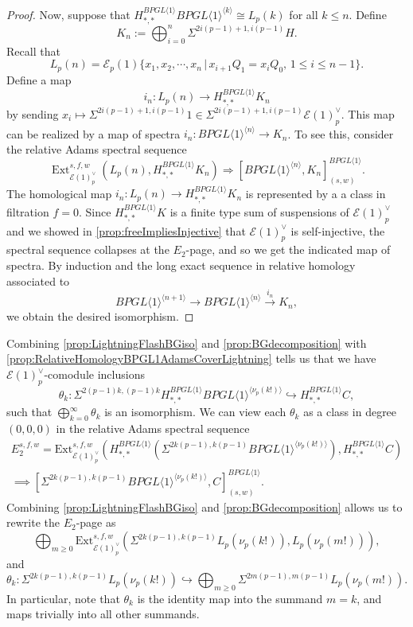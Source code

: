 \documentclass{amsart}
\theoremstyle{plain}
\numberwithin{theorem}{section}
\numberwithin{equation}{section}
\numberwithin{figure}{section}
\DeclareMathOperator{\Ext}{Ext}
\newcommand{\cE}{{\mathcal E}}
\newcommand{\0}{\langle 0 \rangle }
\begin{document}
\begin{proof}
    Now, suppose that $H_{*,*}^{BPGL \langle 1 \rangle}BPGL \langle 1\rangle^{\langle k \rangle} \cong L_p(k)$ for all $k \leq n$. Define    
    \[
    K_n := \bigoplus_{i=0}^n\Sigma^{2i(p - 1)+1,i(p-1)}H.
    \]
     Recall that
    \[L_p(n) = \mathcal{E}_p(1) \{x_1, x_2, \cdots, x_n \, |\,  x_{i + 1} Q_1 =  x_i Q_0,\, 1 \leq i \leq n-1 \}.\]
    Define a map
    \[{i_{n}}:L_p(n) \to H_{*,*}^{BPGL \langle 1 \rangle}K_n\]
    by sending $x_i \mapsto \Sigma^{2i(p - 1)+1,i(p-1)}1 \in \Sigma^{2i(p - 1)+1,i(p-1)}\mathcal{E}(1)^\vee_p$. This map can be realized by a map of spectra $i_n:BPGL \langle 1 \rangle^{\langle n \rangle} \to K_n$. To see this, consider the relative Adams spectral sequence
    \[ \Ext^{s,f,w}_{\cE(1)_p^\vee}\left(L_p(n), H_{*,*}^{BPGL\langle 1 \rangle}K_n \right)\Longrightarrow [BPGL\langle 1 \rangle^{\langle n \rangle}, K_n]_{(s,w)}^{BPGL\langle 1\rangle}.\]
    The homological map $i_n:L_p(n) \to H_{*,*}^{BPGL \langle 1 \rangle}K_n$ is represented by a a class in filtration $f=0$. Since $H_{*,*}^{BPGL\langle 1 \rangle}K$ is a finite type sum of suspensions of $\cE(1)_p^\vee$ and we showed in \cref{prop:freeImpliesInjective} that $\cE(1)_p^\vee$ is self-injective, the spectral sequence collapses at the $E_2$-page, and so we get the indicated map of spectra. By induction and the long exact sequence in relative homology associated to
    \[BPGL \langle 1 \rangle ^{ \langle n+1 \rangle} \to BPGL \langle 1 \rangle ^{\langle n\rangle} \xrightarrow{i_{n}} K_n,\]
    we obtain the desired isomorphism.
\end{proof}

Combining \cref{prop:LightningFlashBGiso} and \cref{prop:BGdecomposition} with \cref{prop:RelativeHomologyBPGL1AdamsCoverLightning} tells us that we have $\cE(1)_p^\vee$-comodule inclusions
\[\theta_k: \Sigma^{2(p-1)k, (p-1)k}H_{*,*}^{BPGL\langle 1\rangle} BPGL\langle 1\rangle^{\langle \nu_p(k!) \rangle} \hookrightarrow H_{*,*}^{BPGL\langle 1 \rangle}C , \]
such that $\bigoplus\limits_{k=0}^{\infty}\theta_k$ is an isomorphism. We can view each $\theta_k$ as a class in degree $(0,0,0)$ in the relative Adams spectral sequence 
\begin{align}
\label{ss:RelativeAssBPGL1Splittings}
    E_2^{s,f,w} = \text{Ext}^{s,f,w}_{\mathcal{E}(1)^\vee_p}\left(H_{*,*}^{BPGL \langle 1 \rangle}\left(\Sigma^{2k(p-1), k(p-1)}BPGL \langle 1 \rangle^{\langle \nu_p(k!) \rangle}\right), H_{*,*}^{BPGL \langle 1 \rangle}C\right) \\
    \implies [\Sigma^{2k(p-1), k(p-1)}BPGL \langle 1 \rangle^{\langle \nu_p(k!) \rangle}, C]^{BPGL \langle 1 \rangle}_{(s,w)}.
\end{align}
Combining \cref{prop:LightningFlashBGiso} and \cref{prop:BGdecomposition} allows us to rewrite the $E_2$-page as  \[\bigoplus_{m \geq 0}\text{Ext}^{s,f,w}_{\mathcal{E}(1)^\vee_p}\left(\Sigma^{2k(p-1), k(p-1)}L_p(\nu_p(k!)), L_p(\nu_p(m!))\right),\]
and \[\theta_k:\Sigma^{2k(p-1), k(p-1)}L_p(\nu_p(k!)) \hookrightarrow \bigoplus_{m \geq 0}\Sigma^{2m(p-1), m(p-1)}L_p(\nu_p(m!)) .\]
In particular, note that $\theta_k$ is the identity map into the summand $m=k$, and maps trivially into all other summands. 
\end{document}
